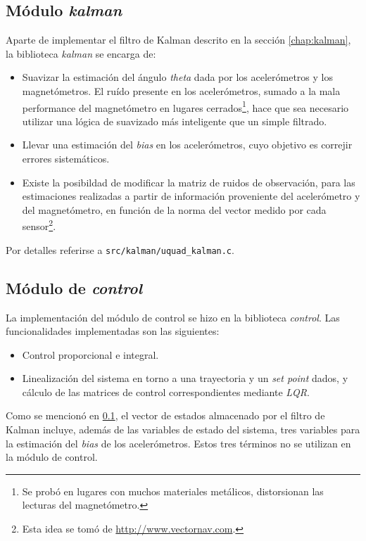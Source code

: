 \documentclass[main]{subfiles}
\begin{document}
\subsection{M\'odulo \textit{kalman}}
\label{sec:software:kalman}

Aparte de implementar el filtro de Kalman descrito en la secci\'on \ref{chap:kalman}, la biblioteca \textit{kalman} se encarga de:


\begin{itemize}
\item Suavizar la estimaci\'on del \'angulo \textit{theta} dada por los aceler\'ometros y los magnet\'ometros. El ru\'ido presente en los aceler\'ometros, sumado a la mala performance del magnet\'ometro en lugares cerrados\footnote{Se prob\'o en lugares con muchos materiales met\'alicos, distorsionan las lecturas del magnet\'ometro.}, hace que sea necesario utilizar una l\'ogica de suavizado m\'as inteligente que un simple filtrado.
\item Llevar una estimaci\'on del \textit{bias} en los aceler\'ometros, cuyo objetivo es correjir errores sistem\'aticos.
\item Existe la posibildad de modificar la matriz de ruidos de observaci\'on, para las estimaciones realizadas a partir de informaci\'on proveniente del aceler\'ometro y del magnet\'ometro, en funci\'on de la norma del vector medido por cada sensor\footnote{Esta idea se tom\'o de \url{http://www.vectornav.com}.}.
\end{itemize}

Por detalles referirse a \verb+src/kalman/uquad_kalman.c+.

\subsection{M\'odulo de \textit{control}}
\label{sec:software:control}

La implementación del módulo de control se hizo en la biblioteca \textit{control}. Las funcionalidades implementadas son las siguientes:

\begin{itemize}
\item Control proporcional e integral.
\item Linealización del sistema en torno a una trayectoria y un \textit{set point} dados, y c\'alculo de las matrices de control correspondientes mediante \textit{LQR}.
\end{itemize}

Como se mencion\'o en \ref{sec:software:kalman}, el vector de estados almacenado por el filtro de Kalman incluye, adem\'as de las variables de estado del sistema, tres variables para la estimaci\'on del \textit{bias} de los aceler\'ometros. Estos tres t\'erminos no se utilizan en la m\'odulo de control.
\end{document}
